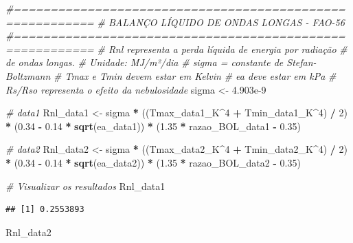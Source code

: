 \documentclass[
]{article}
\newenvironment{Shaded}{\begin{snugshade}}{\end{snugshade}}
\newcommand{\CommentTok}[1]{\textcolor[rgb]{0.56,0.35,0.01}{\textit{#1}}}
\newcommand{\DecValTok}[1]{\textcolor[rgb]{0.00,0.00,0.81}{#1}}
\newcommand{\FloatTok}[1]{\textcolor[rgb]{0.00,0.00,0.81}{#1}}
\newcommand{\FunctionTok}[1]{\textcolor[rgb]{0.13,0.29,0.53}{\textbf{#1}}}
\newcommand{\NormalTok}[1]{#1}
\newcommand{\OtherTok}[1]{\textcolor[rgb]{0.56,0.35,0.01}{#1}}
\newcommand{\SpecialCharTok}[1]{\textcolor[rgb]{0.81,0.36,0.00}{\textbf{#1}}}
\begin{document}
\begin{Shaded}
\begin{Highlighting}[]
\CommentTok{\#=========================================================}
\CommentTok{\# BALANÇO LÍQUIDO DE ONDAS LONGAS {-} FAO{-}56}
\CommentTok{\#=========================================================}
\CommentTok{\# Rnl representa a perda líquida de energia por radiação}
\CommentTok{\# de ondas longas.}
\CommentTok{\# Unidade: MJ/m²/dia}
\CommentTok{\# sigma = constante de Stefan{-}Boltzmann}
\CommentTok{\# Tmax e Tmin devem estar em Kelvin}
\CommentTok{\# ea deve estar em kPa}
\CommentTok{\# Rs/Rso representa o efeito da nebulosidade}
\NormalTok{sigma }\OtherTok{\textless{}{-}} \FloatTok{4.903e{-}9}

\CommentTok{\# data1}
\NormalTok{Rnl\_data1 }\OtherTok{\textless{}{-}}\NormalTok{ sigma }\SpecialCharTok{*}
\NormalTok{  ((Tmax\_data1\_K}\SpecialCharTok{\^{}}\DecValTok{4} \SpecialCharTok{+}\NormalTok{ Tmin\_data1\_K}\SpecialCharTok{\^{}}\DecValTok{4}\NormalTok{) }\SpecialCharTok{/} \DecValTok{2}\NormalTok{) }\SpecialCharTok{*}
\NormalTok{  (}\FloatTok{0.34} \SpecialCharTok{{-}} \FloatTok{0.14} \SpecialCharTok{*} \FunctionTok{sqrt}\NormalTok{(ea\_data1)) }\SpecialCharTok{*}
\NormalTok{  (}\FloatTok{1.35} \SpecialCharTok{*}\NormalTok{ razao\_BOL\_data1 }\SpecialCharTok{{-}} \FloatTok{0.35}\NormalTok{)}

\CommentTok{\# data2}
\NormalTok{Rnl\_data2 }\OtherTok{\textless{}{-}}\NormalTok{ sigma }\SpecialCharTok{*}
\NormalTok{  ((Tmax\_data2\_K}\SpecialCharTok{\^{}}\DecValTok{4} \SpecialCharTok{+}\NormalTok{ Tmin\_data2\_K}\SpecialCharTok{\^{}}\DecValTok{4}\NormalTok{) }\SpecialCharTok{/} \DecValTok{2}\NormalTok{) }\SpecialCharTok{*}
\NormalTok{  (}\FloatTok{0.34} \SpecialCharTok{{-}} \FloatTok{0.14} \SpecialCharTok{*} \FunctionTok{sqrt}\NormalTok{(ea\_data2)) }\SpecialCharTok{*}
\NormalTok{  (}\FloatTok{1.35} \SpecialCharTok{*}\NormalTok{ razao\_BOL\_data2 }\SpecialCharTok{{-}} \FloatTok{0.35}\NormalTok{)}

\CommentTok{\# Visualizar os resultados}
\NormalTok{Rnl\_data1}
\end{Highlighting}
\end{Shaded}

\begin{verbatim}
## [1] 0.2553893
\end{verbatim}

\begin{Shaded}
\begin{Highlighting}[]
\NormalTok{Rnl\_data2}
\end{Highlighting}
\end{Shaded}
\end{document}
